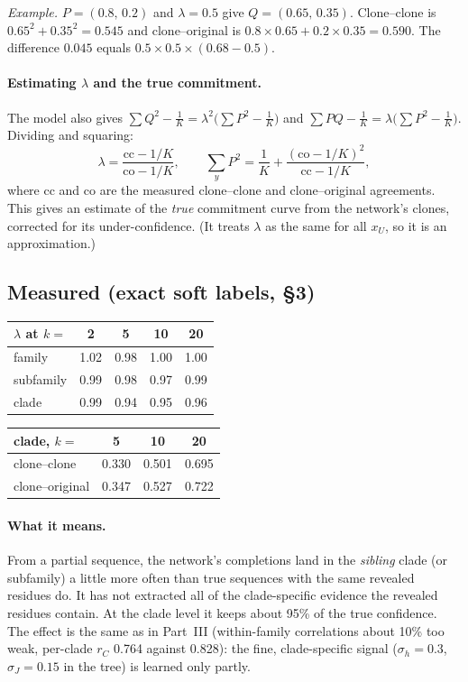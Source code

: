 \documentclass[11pt,a4paper]{article}
\begin{document}
\emph{Example.} $P=(0.8,\,0.2)$ and $\lambda=0.5$ give $Q=(0.65,\,0.35)$. Clone--clone is $0.65^2+0.35^2=0.545$ and
clone--original is $0.8\times0.65+0.2\times0.35=0.590$. The difference $0.045$ equals $0.5\times0.5\times(0.68-0.5)$.

\paragraph{Estimating $\lambda$ and the true commitment.} The model also gives
$\sum Q^2-\frac1K=\lambda^2\big(\sum P^2-\frac1K\big)$ and $\sum PQ-\frac1K=\lambda\big(\sum P^2-\frac1K\big)$. Dividing
and squaring:
\[
\lambda=\frac{\text{cc}-1/K}{\text{co}-1/K},\qquad
\sum_yP^2=\frac1K+\frac{(\text{co}-1/K)^2}{\text{cc}-1/K},
\]
where cc and co are the measured clone--clone and clone--original agreements. This gives an estimate of the \emph{true}
commitment curve from the network's clones, corrected for its under-confidence. (It treats $\lambda$ as the same for
all $x_U$, so it is an approximation.)

\subsection{Measured (exact soft labels, \S3)}
\begin{center}\small
\begin{tabular}{lcccc}
\toprule
$\lambda$ at $k=$ & 2 & 5 & 10 & 20\\
\midrule
family & 1.02 & 0.98 & 1.00 & 1.00\\
subfamily & 0.99 & 0.98 & 0.97 & 0.99\\
clade & 0.99 & 0.94 & 0.95 & 0.96\\
\bottomrule
\end{tabular}
\qquad
\begin{tabular}{lccc}
\toprule
clade, $k=$ & 5 & 10 & 20\\
\midrule
clone--clone & 0.330 & 0.501 & 0.695\\
clone--original & 0.347 & 0.527 & 0.722\\
\bottomrule
\end{tabular}
\end{center}
\paragraph{What it means.} From a partial sequence, the network's completions land in the \emph{sibling} clade (or
subfamily) a little more often than true sequences with the same revealed residues do. It has not extracted all of the
clade-specific evidence the revealed residues contain. At the clade level it keeps about 95\% of the true confidence.
The effect is the same as in Part~III (within-family correlations about 10\% too weak, per-clade $r_C$ 0.764 against
0.828): the fine, clade-specific signal ($\sigma_h=0.3$, $\sigma_J=0.15$ in the tree) is learned only partly.
\end{document}
